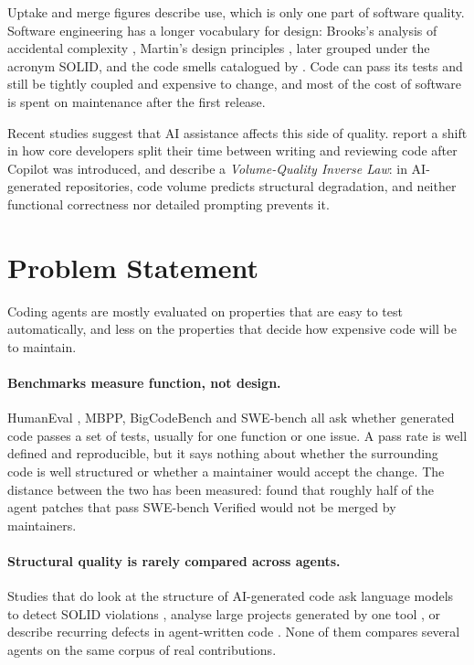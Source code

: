 Uptake and merge figures describe use, which is only one part of software quality. Software
engineering has a longer vocabulary for design: Brooks's analysis of accidental complexity
\citep{brooks1975mythical}, Martin's design principles \citep{martin2000solid}, later grouped under
the acronym SOLID, and the code smells catalogued by \citet{fowler1999refactoring}. Code can pass
its tests and still be tightly coupled and expensive to change, and most of the cost of software is
spent on maintenance after the first release.

Recent studies suggest that AI assistance affects this side of quality. \citet{xu2025productivity}
report a shift in how core developers split their time between writing and reviewing code after
Copilot was introduced, and \citet{zhu2026smells} describe a \emph{Volume-Quality Inverse Law}: in
AI-generated repositories, code volume predicts structural degradation, and neither functional
correctness nor detailed prompting prevents it.

\section{Problem Statement}
\label{sec:problem-statement}

Coding agents are mostly evaluated on properties that are easy to test automatically, and less on
the properties that decide how expensive code will be to maintain.

\paragraph{Benchmarks measure function, not design.} HumanEval \citep{chen2021codex}, MBPP,
BigCodeBench \citep{zhuo2024bigcodebench} and SWE-bench \citep{jimenez2024swebench} all ask whether
generated code passes a set of tests, usually for one function or one issue. A pass rate is well
defined and reproducible, but it says nothing about whether the surrounding code is well structured
or whether a maintainer would accept the change. The distance between the two has been measured:
\citet{metr2026sweverified} found that roughly half of the agent patches that pass SWE-bench Verified
would not be merged by maintainers.

\paragraph{Structural quality is rarely compared across agents.} Studies that do look at the
structure of AI-generated code ask language models to detect SOLID violations
\citep{pehlivan2025solid}, analyse large projects generated by one tool
\citep{beyond2026designissues}, or describe recurring defects in agent-written code
\citep{zhu2026smells}. None of them compares several agents on the same corpus of real
contributions.

